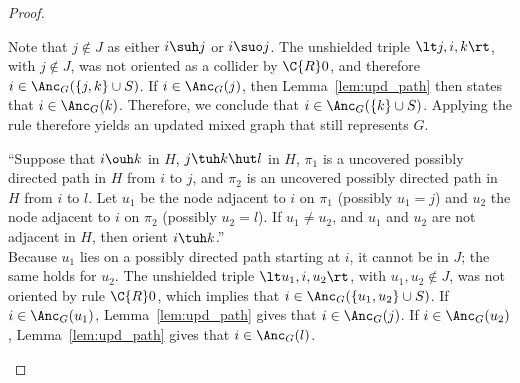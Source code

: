 \begin{proof}
\begin{description}
      Note that $j \notin J$ as either $i \suh j$ or $i \suo j$.
      The unshielded triple $\lt j, i, k \rt$, with $j \notin J$, was not oriented as a collider by $\C{R}0$, and therefore $i \in \Anc_G(\{j,k\} \cup S)$.
      If $i \in \Anc_G(j)$, then Lemma~\ref{lem:upd_path} then states that $i \in \Anc_G(k)$.
      Therefore, we conclude that $i \in \Anc_G(\{k\} \cup S)$.
      Applying the rule therefore yields an updated mixed graph that still represents $G$.
    \item[$\C{R}10$] ``Suppose that $i \ouh k$ in $H$, $j \tuh k \hut l$ in $H$, $\pi_1$ is a uncovered possibly directed path in $H$ from $i$ to $j$, and $\pi_2$ is an uncovered possibly directed path in $H$ from $i$ to $l$. Let $u_1$ be the node adjacent to $i$ on $\pi_1$ (possibly $u_1 = j$) and $u_2$ the node adjacent to $i$ on $\pi_2$ (possibly $u_2 = l$). If $u_1 \ne u_2$, and $u_1$ and $u_2$ are not adjacent in $H$, then orient $i \tuh k$.''\\
      Because $u_1$ lies on a possibly directed path starting at $i$, it cannot be in $J$; the same holds for $u_2$.
      The unshielded triple $\lt u_1, i, u_2 \rt$, with $u_1, u_2 \notin J$, was not oriented by rule $\C{R}0$, which implies that $i \in \Anc_G(\{u_1,u_2\} \cup S)$. 
      If $i \in \Anc_G(u_1)$, Lemma~\ref{lem:upd_path} gives that $i \in \Anc_G(j)$.
      If $i \in \Anc_G(u_2)$, Lemma~\ref{lem:upd_path} gives that $i \in \Anc_G(l)$.
%

\end{description}
\end{proof}
